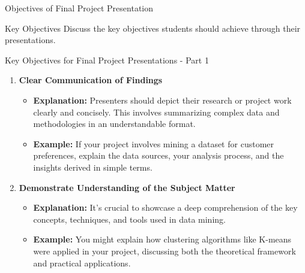 \documentclass[aspectratio=169]{beamer}
\begin{document}
\begin{frame}[fragile]{Objectives of Final Project Presentation}
  \begin{block}{Key Objectives}
    Discuss the key objectives students should achieve through their presentations.
  \end{block}
\end{frame}

\begin{frame}[fragile]{Key Objectives for Final Project Presentations - Part 1}
  \begin{enumerate}
    \item \textbf{Clear Communication of Findings}
      \begin{itemize}
        \item \textbf{Explanation:} Presenters should depict their research or project work clearly and concisely. This involves summarizing complex data and methodologies in an understandable format.
        \item \textbf{Example:} If your project involves mining a dataset for customer preferences, explain the data sources, your analysis process, and the insights derived in simple terms.
      \end{itemize}

    \item \textbf{Demonstrate Understanding of the Subject Matter}
      \begin{itemize}
        \item \textbf{Explanation:} It's crucial to showcase a deep comprehension of the key concepts, techniques, and tools used in data mining.
        \item \textbf{Example:} You might explain how clustering algorithms like K-means were applied in your project, discussing both the theoretical framework and practical applications.
      \end{itemize}
  \end{enumerate}
\end{frame}
\end{document}
